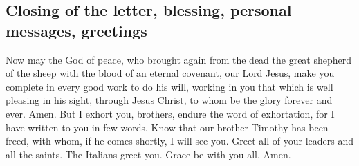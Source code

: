 \hypertarget{closing-of-the-letter-blessing-personal-messages-greetings}{%
\subsection{Closing of the letter, blessing, personal messages,
greetings}\label{closing-of-the-letter-blessing-personal-messages-greetings}}

 Now may the God of peace, who brought again from the
dead the great shepherd of the sheep with the blood of an eternal
covenant, our Lord Jesus,  make you complete in every
good work to do his will, working in you that which is well pleasing in
his sight, through Jesus Christ, to whom be the glory forever and ever.
Amen.  But I exhort you, brothers, endure the word of
exhortation, for I have written to you in few words. 
Know that our brother Timothy has been freed, with whom, if he comes
shortly, I will see you.  Greet all of your leaders and
all the saints. The Italians greet you.  Grace be with
you all. Amen.
